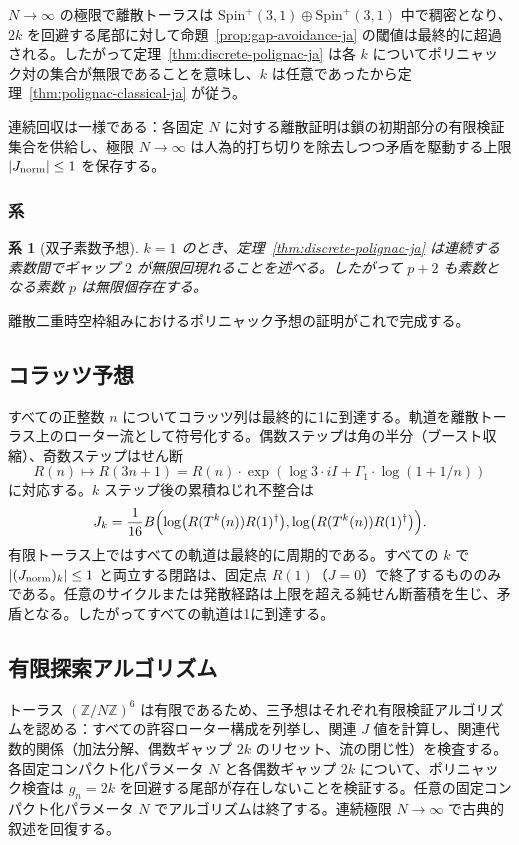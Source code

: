 \documentclass[dvipdfmx,a4paper]{article}
\newtheorem{corollary}[theorem]{系}
\theoremstyle{definition}
\theoremstyle{remark}
\newcommand{\Jnorm}{J_{\rm norm}}
\begin{document}
$N \to \infty$ の極限で離散トーラスは $\mathrm{Spin}^+(3,1) \oplus \mathrm{Spin}^+(3,1)$ 中で稠密となり、$2k$ を回避する尾部に対して命題~\ref{prop:gap-avoidance-ja} の閾値は最終的に超過される。したがって定理~\ref{thm:discrete-polignac-ja} は各 $k$ についてポリニャック対の集合が無限であることを意味し、$k$ は任意であったから定理~\ref{thm:polignac-classical-ja} が従う。

連続回収は一様である：各固定 $N$ に対する離散証明は鎖の初期部分の有限検証集合を供給し、極限 $N \to \infty$ は人為的打ち切りを除去しつつ矛盾を駆動する上限 $|\Jnorm| \leq 1$ を保存する。

\subsubsection{系}

\begin{corollary}[双子素数予想]
\label{cor:twin-prime-ja}
$k = 1$ のとき、定理~\ref{thm:discrete-polignac-ja} は連続する素数間でギャップ $2$ が無限回現れることを述べる。したがって $p + 2$ も素数となる素数 $p$ は無限個存在する。
\end{corollary}

離散二重時空枠組みにおけるポリニャック予想の証明がこれで完成する。

\subsection{コラッツ予想}

すべての正整数 $n$ についてコラッツ列は最終的に1に到達する。軌道を離散トーラス上のローター流として符号化する。偶数ステップは角の半分（ブースト収縮）、奇数ステップはせん断
\[
R(n) \mapsto R(3n+1) = R(n) \cdot \exp(\log 3 \cdot iI + \Gamma_1 \cdot \log(1 + 1/n))
\]
に対応する。$k$ ステップ後の累積ねじれ不整合は
\[
J_k = \frac{1}{16} B\Bigl( \log\bigl(R(T^k(n)) R(1)^\dagger\bigr), \log\bigl(R(T^k(n)) R(1)^\dagger\bigr) \Bigr).
\]
有限トーラス上ではすべての軌道は最終的に周期的である。すべての $k$ で $|(\Jnorm)_k| \leq 1$ と両立する閉路は、固定点 $R(1)$（$J = 0$）で終了するもののみである。任意のサイクルまたは発散経路は上限を超える純せん断蓄積を生じ、矛盾となる。したがってすべての軌道は1に到達する。

\subsection{有限探索アルゴリズム}

トーラス $(\mathbb{Z}/N\mathbb{Z})^6$ は有限であるため、三予想はそれぞれ有限検証アルゴリズムを認める：すべての許容ローター構成を列挙し、関連 $J$ 値を計算し、関連代数的関係（加法分解、偶数ギャップ $2k$ のリセット、流の閉じ性）を検査する。各固定コンパクト化パラメータ $N$ と各偶数ギャップ $2k$ について、ポリニャック検査は $g_n = 2k$ を回避する尾部が存在しないことを検証する。任意の固定コンパクト化パラメータ $N$ でアルゴリズムは終了する。連続極限 $N \to \infty$ で古典的叙述を回復する。
\end{document}
